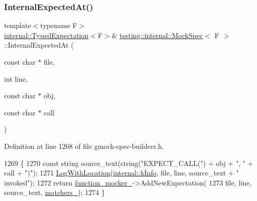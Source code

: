 \subsubsection{\texorpdfstring{Internal\+Expected\+At()}{InternalExpectedAt()}}
{\footnotesize\ttfamily template$<$typename F$>$ \\
\hyperlink{classtesting_1_1internal_1_1TypedExpectation}{internal\+::\+Typed\+Expectation}$<$F$>$\& \hyperlink{classtesting_1_1internal_1_1MockSpec}{testing\+::internal\+::\+Mock\+Spec}$<$ F $>$\+::Internal\+Expected\+At (\begin{DoxyParamCaption}\item[{const char $\ast$}]{file,  }\item[{int}]{line,  }\item[{const char $\ast$}]{obj,  }\item[{const char $\ast$}]{call }\end{DoxyParamCaption})\hspace{0.3cm}{\ttfamily [inline]}}



Definition at line 1268 of file gmock-\/spec-\/builders.\+h.


\begin{DoxyCode}
1269                                                                      \{
1270     \textcolor{keyword}{const} \textcolor{keywordtype}{string} source\_text(\textcolor{keywordtype}{string}(\textcolor{stringliteral}{"EXPECT\_CALL("}) + obj + \textcolor{stringliteral}{", "} + call + \textcolor{stringliteral}{")"});
1271     \hyperlink{namespacetesting_1_1internal_af271cd1fc0b62a7f4736cb3109e86a37}{LogWithLocation}(\hyperlink{namespacetesting_1_1internal_a203d1a8a2147a53d12bbdae40d443914a396aacfaee2849eaab7c1de9773d624d}{internal::kInfo}, file, line, source\_text + \textcolor{stringliteral}{" invoked"});
1272     \textcolor{keywordflow}{return} \hyperlink{classtesting_1_1internal_1_1MockSpec_a9dafaf30cc5ecfe824d1b92949e2054a}{function\_mocker\_}->AddNewExpectation(
1273         file, line, source\_text, \hyperlink{classtesting_1_1internal_1_1MockSpec_acb32a52e9244cfc33601de0fcc96aa2f}{matchers\_});
1274   \}
\end{DoxyCode}
\mbox{\label{classtesting_1_1internal_1_1MockSpec_a6b4fd303136c6282b19ddb16100f02a2}} 
